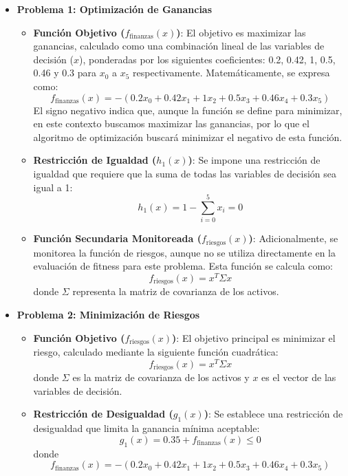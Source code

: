 \begin{itemize}
    \item \textbf{Problema 1: Optimización de Ganancias}
    \begin{itemize}
        \item \textbf{Función Objetivo ($f_{\text{finanzas}}(x)$)}: El objetivo es maximizar las ganancias, calculado como una combinación lineal de las variables de decisión ($x$), ponderadas por los siguientes coeficientes: 0.2, 0.42, 1, 0.5, 0.46 y 0.3 para $x_0$ a $x_5$ respectivamente. Matemáticamente, se expresa como:
        \[
        f_{\text{finanzas}}(x) = -(0.2x_0 + 0.42x_1 + 1x_2 + 0.5x_3 + 0.46x_4 + 0.3x_5)
        \]
        El signo negativo indica que, aunque la función se define para minimizar, en este contexto buscamos maximizar las ganancias, por lo que el algoritmo de optimización buscará minimizar el negativo de esta función.

        \item \textbf{Restricción de Igualdad ($h_1(x)$)}: Se impone una restricción de igualdad que requiere que la suma de todas las variables de decisión sea igual a 1:
        \[
        h_1(x) = 1 - \sum_{i=0}^{5} x_i = 0
        \]

        \item \textbf{Función Secundaria Monitoreada ($f_{\text{riesgos}}(x)$)}: Adicionalmente, se monitorea la función de riesgos, aunque no se utiliza directamente en la evaluación de fitness para este problema. Esta función se calcula como:
        \[
        f_{\text{riesgos}}(x) = x^T \Sigma x
        \]
        donde $\Sigma$ representa la matriz de covarianza de los activos.
    \end{itemize}

    \item \textbf{Problema 2: Minimización de Riesgos}
    \begin{itemize}
        \item \textbf{Función Objetivo ($f_{\text{riesgos}}(x)$)}: El objetivo principal es minimizar el riesgo, calculado mediante la siguiente función cuadrática:
        \[
        f_{\text{riesgos}}(x) = x^T \Sigma x
        \]
        donde $\Sigma$ es la matriz de covarianza de los activos y $x$ es el vector de las variables de decisión.

        \item \textbf{Restricción de Desigualdad ($g_1(x)$)}: Se establece una restricción de desigualdad que limita la ganancia mínima aceptable:
        \[
        g_1(x) = 0.35 + f_{\text{finanzas}}(x) \leq 0
        \]
        donde
        \[
        f_{\text{finanzas}}(x) = -(0.2x_0 + 0.42x_1 + 1x_2 + 0.5x_3 + 0.46x_4 + 0.3x_5)
        \]


\end{itemize}
\end{itemize}

